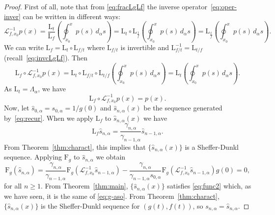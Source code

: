\documentclass[11pt]{article}
\theoremstyle{plain}
\theoremstyle{remark}
\numberwithin{equation}{section} %
\newcommand{\La}{\Lambda_{\alpha}}
\newcommand{\FF}{\mathrm{F}}
\newcommand{\LL}{\mathrm{L}}
\begin{document}
\begin{proof}
First of all, note that from \eqref{eq:fracLgLf} the inverse operator~\eqref{eq:oper-inver} can be written in different ways:
\[
\mathcal{L}_{f,x_0}^{-1}p(x) = \frac{\LL_t}{\LL_{f}} \left(\oint_{x_0}^x p(s)\,d_{\alpha}s\right)
= \LL_t\circ\LL_{\frac{1}{f}}\left(\oint_{x_0}^x p(s)\,d_{\alpha}s\right)
= \LL_{\frac{t}{f}}\left(\oint_{x_0}^x p(s)\,d_{\alpha}s\right).
\]
We can write $\LL_f = \LL_t\circ\LL_{f/t}$ where $\LL_{f/t}$ is invertible and $\LL_{f/t}^{-1} =\LL_{t/f}$ (recall~\eqref{eq:invcLgLf}). Then
\[
\LL_f\circ \mathcal{L}_{f,x_0}^{-1}p(x) 
= \LL_t\circ \LL_{f/t}\circ \LL_{t/f}\left(\oint_{x_0}^x p(s)\,d_{\alpha}s\right) 
= \LL_t\left(\oint_{x_0}^x p(s)\,d_{\alpha}s\right).
\]
As $\LL_t=\La$, we have 
\[
\LL_f\circ \mathcal{L}_{f,x_0}^{-1}p(x)=p(x).
\]
Now, let $\hat{s}_{0,\alpha} = s_{0,\alpha} = 1/g(0)$ and $\hat{s}_{n,\alpha}(x)$ be the sequence generated by~\eqref{eq:recur}. When we apply $\LL_f$ to $\hat{s}_{n,\alpha}(x)$ we have
\[
\LL_f\hat{s}_{n,\alpha} = \frac{\gamma_{n,\alpha}}{\gamma_{n-1,\alpha}}\hat{s}_{n-1,\alpha}.
\]
From Theorem~\ref{thm:charact}, this implies that $\{\hat{s}_{n,\alpha}(x)\}$ is a Sheffer-Dunkl sequence. Applying $\FF_g$ to $\hat{s}_{n,\alpha}$ we obtain
\[
\FF_g(\hat{s}_{n,\alpha}) = \frac{\gamma_{n,\alpha}}{\gamma_{n-1,\alpha}} 
\FF_g(\mathcal{L}_{f,x_0}^{-1}\hat{s}_{n-1,\alpha}) 
- \frac{\gamma_{n,\alpha}}{\gamma_{n-1,\alpha}s_{0,\alpha}} 
\FF_g(\mathcal{L}_{f,x_0}^{-1}\hat{s}_{n-1,\alpha})g(0) = 0,
\]
for all $n\ge 1$. From Theorem~\ref{thm:main}, $\{\hat{s}_{n,\alpha}(x)\}$ satisfies \eqref{eq:func2} which, as we have seen, it is the same of \eqref{eq:g-aso}. From Theorem~\ref{thm:charact}, $\{\hat{s}_{n,\alpha}(x)\}$ is the Sheffer-Dunkl sequence for $(g(t),f(t))$, so $s_{n,\alpha} = \hat{s}_{n,\alpha}$.
\end{proof}
\end{document}
